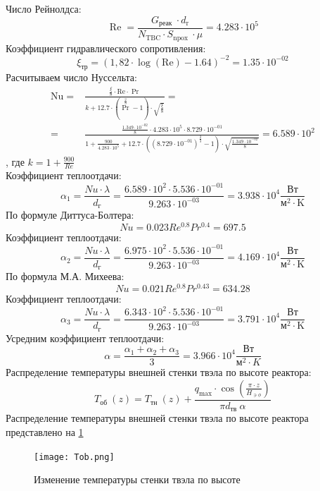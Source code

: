 Число Рейнолдса:
$$
\operatorname{Re}=\frac{G_{\text {реак }} \cdot d_{\mathrm{r}}}{N_{\mathrm{TBC}} \cdot S_{\text {npox }} \cdot \mu} = 4.283 \cdot 10^{ 5 }
$$
Коэффициент гидравлического сопротивления:
$$
\xi_{\text{тр}}=(1,82 \cdot \log (\mathrm{Re})-1.64)^{-2}= 1.35 \cdot 10^{-02}
$$
Расчитываем число Нуссельта:
\begin{align*}
\mathrm{Nu}=&\frac{\frac{\xi}{8} \cdot \mathrm{Re} \cdot \operatorname{Pr}}{k+12.7 \cdot\left(\operatorname{Pr}^{\frac{2}{3}}-1\right) \cdot \sqrt{\frac{\xi}{8}}}
=\\=&
\frac{ 
    \frac{1.349 \cdot 10^{ -02 }}{8} \cdot 4.283 \cdot 10^{ 5 } \cdot 8.729 \cdot 10^{ -01 } 
}
{ 
    1 + \frac{900}{4.283 \cdot 10^{ 5 }} + 12.7 \cdot\left((8.729 \cdot 10^{ -01 })^{\frac{2}{3}}-1\right) \cdot \sqrt{\frac{1.349 \cdot 10^{ -02 }}{8}} 
} = 6.589 \cdot 10^{ 2 }
\end{align*}, где $k = 1 + \frac{900}{Re}$  \\
Коэффициент теплоотдачи:
    $$
    \alpha_1 = \frac {Nu \cdot \lambda} {d_\text{г}} = \frac {6.589 \cdot 10^{ 2 } \cdot 5.536 \cdot 10^{ -01 }}{9.263 \cdot 10^{ -03 }} = 3.938 \cdot 10^{ 4 } \frac {\text{Вт}}{\text{м}^2\cdot\mathrm{K}}
    $$
По формуле Диттуса-Болтера:
    $$
    Nu = 0.023Re^{0.8}Pr^{0.4} = 697.5
    $$
Коэффициент теплоотдачи:
    $$
    \alpha_2 = \frac {Nu \cdot \lambda} {d_\text{г}} = \frac {6.975 \cdot 10^{ 2 } \cdot 5.536 \cdot 10^{ -01 }}{9.263 \cdot 10^{ -03 }} = 4.169 \cdot 10^{ 4 } \frac {\text{Вт}}{\text{м}^2\cdot\mathrm{K}}
    $$
По формула М.А. Михеева:
    $$
    Nu = 0.021Re^{0.8}Pr^{0.43} = 634.28
    $$
Коэффициент теплоотдачи:
    $$
    \alpha_3 = \frac {Nu \cdot \lambda} {d_\text{г}} = \frac {6.343 \cdot 10^{ 2 } \cdot 5.536 \cdot 10^{ -01 }}{9.263 \cdot 10^{ -03 }} = 3.791 \cdot 10^{ 4 } \frac {\text{Вт}}{\text{м}^2\cdot\mathrm{K}}
    $$
Усредним коэффициент теплоотдачи:
    $$
    \alpha = \frac {\alpha_1 + \alpha_2 + \alpha_3} {3} = 3.966 \cdot 10^{ 4 } \frac{\text{Вт}}{\text{м}^2 \cdot K}
    $$
Распределение температуры внешней стенки твэла по высоте реактора:
    $$
    T_{\text {об }}(z)=T_{\text {тн }}(z)+\frac{q_{\max } \cdot \cos \left(\frac{\pi \cdot z}{H_{\ni \phi}}\right)}{\pi d_{\text {тв }} \alpha}
    $$
Распределение температуры внешней стенки
твэла по высоте реактора представлено на \ref{pic:Tob}

\begin{figure}[H]
	\begin{center}
		\texttt{[image: Tob.png]}
		\caption{Изменение температуры стенки твэла по высоте}
		\label{pic:Tob} %
	\end{center}
\end{figure}

